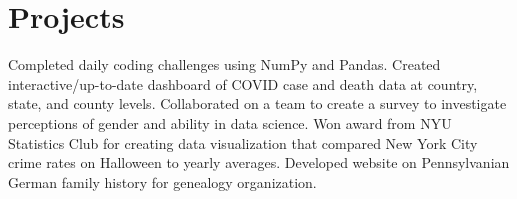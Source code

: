 \documentclass[letterpaper,11pt]{article}
\begin{document}
\section{Projects}
\resumeItemListStart
				{Completed daily coding challenges using NumPy and Pandas.}
				 {Created interactive/up-to-date dashboard of COVID case and death data at country,  state,  and county levels.}
				{Collaborated on a team to create a survey to investigate perceptions of gender and ability in data science.}
				 {Won award from NYU Statistics Club for creating data visualization that compared New York City crime rates on Halloween to yearly averages.}
				{Developed website on Pennsylvanian German family history for genealogy organization.}
\resumeItemListEnd





\end{document}
